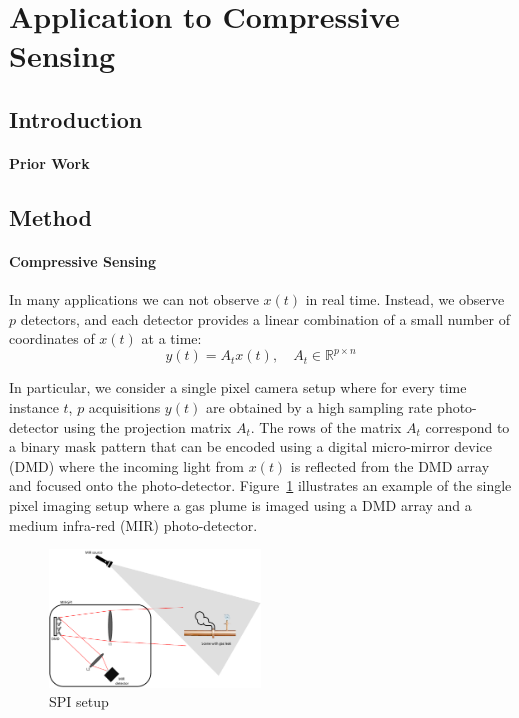 \section{Application to Compressive Sensing}
\subsection{Introduction}
\paragraph{Prior Work}
\subsection{Method}
\paragraph{Compressive Sensing} In many applications we can not observe $x(t)$ in real time. Instead, we observe $p$ detectors, and each detector provides a linear combination of a small number of coordinates of $x(t)$ at a time:
\begin{equation}
    \label{eq:cs_definition}
    y(t) = A_t x(t), \quad A_t \in \mathbb{R}^{p\times n}
\end{equation}

In particular, we consider a single pixel camera setup where for every time instance $t$, $p$ acquisitions $y(t)$ are obtained by a high sampling rate photo-detector using the projection matrix $A_t$. The rows of the matrix $A_t$ correspond to a binary mask pattern that can be encoded using a digital micro-mirror device (DMD) where the incoming light from $x(t)$ is reflected from the DMD array and focused onto the photo-detector. Figure~\ref{fig:SPI} illustrates an example of the single pixel imaging setup where a gas plume is imaged using a DMD array and a medium infra-red (MIR) photo-detector. 
\begin{figure}
\centering
\includegraphics[width = 0.5\textwidth]{figures/SPI_setup.pdf}
\caption{SPI setup \label{fig:SPI}}
\end{figure}

